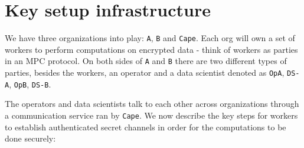 \section{Key setup infrastructure}

We have three organizations into play: \verb|A|, \verb|B| and \verb|Cape|.
Each org will own a set of workers to perform computations on encrypted data
- think of workers as parties in an MPC protocol. On both sides of \verb|A|
and \verb|B| there are two different types of parties, besides the workers,
an operator and a data scientist denoted as \verb|OpA|, \verb|DS-A|,
\verb|OpB|, \verb|DS-B|.

The operators and data scientists talk to each other across organizations through a
communication service ran by \verb|Cape|.
We now describe the key steps for workers to establish authenticated secret channels
in order for the computations to be done securely:
